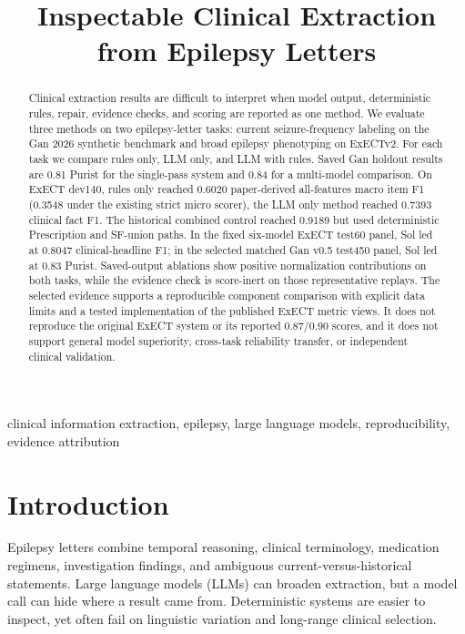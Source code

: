 \documentclass[conference]{IEEEtran}
\begin{document}
\title{Inspectable Clinical Extraction from Epilepsy Letters}

\author{}

\maketitle

\begin{abstract}
Clinical extraction results are difficult to interpret when model output,
deterministic rules, repair, evidence checks, and scoring are reported as one
method. We evaluate three methods on two
epilepsy-letter tasks: current seizure-frequency labeling on the Gan 2026
synthetic benchmark and broad epilepsy phenotyping on ExECTv2. For each task we
compare rules only, LLM only, and LLM with rules. Saved Gan holdout results are
0.81 Purist for the single-pass system and 0.84 for a multi-model
comparison. On ExECT dev140, rules only reached 0.6020 paper-derived all-features
macro item F1 (0.3548 under the existing strict micro scorer), the LLM only
method reached 0.7393 clinical fact F1. The historical combined control reached
0.9189 but used deterministic Prescription and SF-union paths. In the fixed
six-model ExECT test60 panel, Sol led at 0.8047 clinical-headline F1; in the
selected matched Gan v0.5 test450 panel, Sol led at 0.83 Purist.
Saved-output ablations show positive normalization contributions on both tasks,
while the evidence check is score-inert on those representative replays. The
selected evidence supports a reproducible component comparison with explicit
data limits and a tested implementation of the published ExECT metric views. It
does not reproduce the original ExECT system or its reported 0.87/0.90 scores,
and it does not support general model superiority, cross-task reliability
transfer, or independent clinical validation.
\end{abstract}

\begin{IEEEkeywords}
clinical information extraction, epilepsy, large language models,
reproducibility, evidence attribution
\end{IEEEkeywords}

\section{Introduction}

Epilepsy letters combine temporal reasoning, clinical terminology, medication
regimens, investigation findings, and ambiguous current-versus-historical
statements. Large language models (LLMs) can broaden extraction, but a model
call can hide where a result came from. Deterministic systems are easier to
inspect, yet often fail on linguistic variation and long-range clinical
selection.
\end{document}

